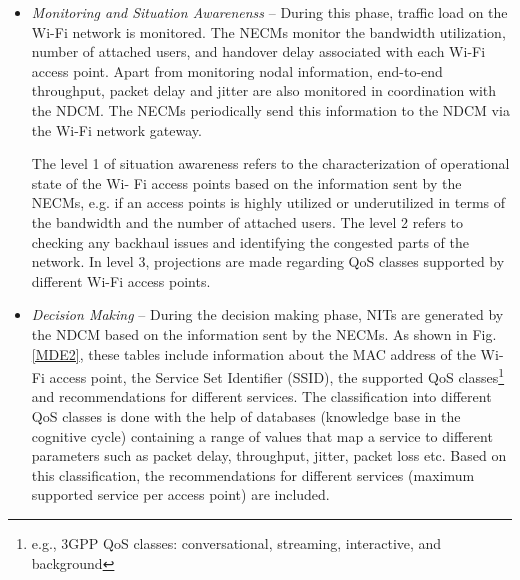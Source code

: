 \documentclass[journal]{IEEEtran}
\begin{document}
\begin{itemize}


\item \emph{Monitoring and Situation Awarenenss} -- During this phase, traffic load on the Wi-Fi network is monitored. The NECMs monitor the bandwidth utilization, number of attached users, and handover delay associated with each Wi-Fi access point. Apart from monitoring nodal information, end-to-end throughput, packet delay and jitter are also monitored in coordination with the NDCM. The NECMs periodically send this information to the NDCM via the Wi-Fi network gateway.

The level 1 of situation awareness refers to the characterization of operational state of the Wi- Fi access points based on the information sent by the NECMs, e.g. if an access points is highly utilized or underutilized in terms of the bandwidth and the number of attached users. The level 2 refers to checking any backhaul issues and identifying the congested parts of the network. In level 3, projections are made regarding QoS classes supported by different Wi-Fi access points.

\item \emph{Decision Making} -- During the decision making phase, NITs are generated by the NDCM based on the information sent by the NECMs. As shown in Fig. \ref{MDE2}, these tables include information about the MAC address of the Wi-Fi access point, the Service Set Identifier (SSID), the supported QoS classes\footnote{e.g., 3GPP QoS classes: conversational, streaming, interactive, and background} and recommendations for different services. The classification into different QoS classes is done with the help of databases (knowledge base in the cognitive cycle) containing a range of values that map a service to different parameters such as packet delay, throughput, jitter, packet loss etc. Based on this classification, the recommendations for different services (maximum supported service per access point) are included.


\end{itemize}
\end{document}
